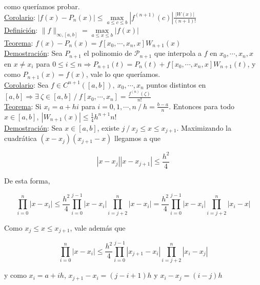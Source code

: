 como quer\'iamos probar.\\

\underline{Corolario}: $|f(x) - P_{n}(x)| \leq \max \limits_{a \leq c \leq b} |f^{(n + 1)}(c)|\frac{|W(x)|}{(n + 1)!}$\\

\underline{Definici\'on}: $\|f\|_{\infty, [a, b]} = \max \limits_{a \leq x \leq b} |f(x)|$\\

\underline{Teorema}: $f(x) - P_{n}(x) = f[x_{0}, \cdots, x_{n}, x]W_{n + 1}(x)$\\

\underline{Demostraci\'on}: Sea $P_{n + 1}$ el polinomio de $\mathcal{P}_{n + 1}$ que interpola a $f$ en $x_{0}, \cdots, x_{n}, x$ en $x \neq x_{i}$ para $0 \leq i \leq n \Rightarrow P_{n + 1}(t) = P_{n}(t) + f[x_{0}, \cdots, x_{n}, x]W_{n + 1}(t)$, y como $P_{n + 1}(x) = f(x)$, vale lo que quer\'iamos.\\

\underline{Corolario}: Sea $f \in C^{n + 1}([a, b]),\ x_{0}, \cdots, x_{n}$ puntos distintos en $[a, b] \Rightarrow \exists \ \zeta \in [a, b] \ / \ f[x_{0}, \cdots, x_{n}] = \frac{f^{(n)}(\zeta)}{n!}$\\

\underline{Teorema}: Si $x_{i} = a + hi$ para $i = 0, 1, \cdots, n \ / \ h = \frac{b - a}{n}$. Entonces para todo $x \in [a, b], \ |W_{n + 1}(x)| \leq \frac{1}{4}h^{n + 1}n!$\\

\underline{Demostraci\'on}: Sea $x \in [a, b]$, existe $j \ / \ x_{j} \leq x \leq x_{j + 1}$. Maximizando la cuadr\'atica $(x - x_{j})(x_{j + 1} - x)$ llegamos a que

$$|x - x_{j}||x - x_{j + 1}| \leq \frac{h^{2}}{4}$$

De esta forma,

$$\prod \limits_{i = 0}^{n} |x - x_{i}| \leq \frac{h^{2}}{4} \prod \limits_{i = 0}^{j - 1} |x - x_{i}|\prod \limits_{i = j + 2}^{n} |x - x_{i}| = \frac{h^{2}}{4} \prod \limits_{i = 0}^{j - 1} |x - x_{i}|\prod \limits_{i = j + 2}^{n} |x_{i} - x|$$

Como $x_{j} \leq x \leq x_{j + 1}$, vale adem\'as que

$$\prod \limits_{i = 0}^{n} |x - x_{i}| \leq \frac{h^{2}}{4} \prod \limits_{i = 0}^{j - 1} |x_{j + 1} - x_{i}|\prod \limits_{i = j + 2}^{n} |x_{i} - x_{j}|$$

y como $x_{i} = a + ih$, $x_{j + 1} - x_{i} = (j - i + 1)h$ y $x_{i} - x_{j} = (i - j)h$

